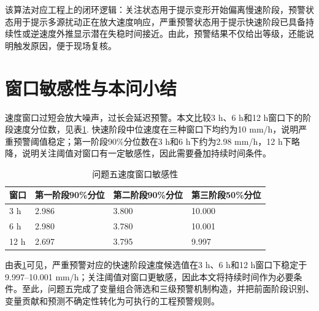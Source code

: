 该算法对应工程上的闭环逻辑：关注状态用于提示变形开始偏离慢速阶段，预警状态用于提示多源扰动正在放大速度响应，严重预警状态用于提示快速阶段已具备持续性或逆速度外推显示潜在失稳时间接近。由此，预警结果不仅给出等级，还能说明触发原因，便于现场复核。

\section{窗口敏感性与本问小结}

速度窗口过短会放大噪声，过长会延迟预警。本文比较3 h、6 h和12 h窗口下的阶段速度分位数，见表\ref{tab:q5_window}. 快速阶段中位速度在三种窗口下均约为10 mm/h，说明严重预警阈值稳定；第一阶段90\%分位数在3 h和6 h下约为2.98 mm/h，12 h下略降，说明关注阈值对窗口有一定敏感性，因此需要叠加持续时间条件。

\begin{table}[htbp]
\centering
\small
\caption{问题五速度窗口敏感性}
\label{tab:q5_window}
\begin{tabular}{llll}
\toprule
窗口 & 第一阶段90\%分位 & 第二阶段90\%分位 & 第三阶段50\%分位 \\
\midrule
3 h & 2.986 & 3.800 & 10.000 \\
6 h & 2.980 & 3.780 & 10.001 \\
12 h & 2.697 & 3.795 & 9.997 \\
\bottomrule
\end{tabular}
\end{table}

由表\ref{tab:q5_window}可见，严重预警对应的快速阶段速度候选值在3 h、6 h和12 h窗口下稳定于9.997--10.001 mm/h；关注阈值对窗口更敏感，因此本文将持续时间作为必要条件。至此，问题五完成了变量组合筛选和三级预警机制构造，并把前面阶段识别、变量贡献和预测不确定性转化为可执行的工程预警规则。
